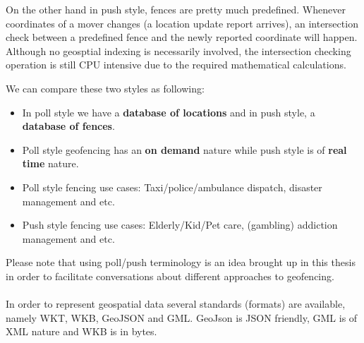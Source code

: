 \documentclass[a4]{report}
\begin{document}
    On the other hand in push style, fences are pretty much predefined.
    Whenever coordinates of a mover changes (a location update report arrives), an intersection check between a
    predefined fence and the newly reported coordinate will happen.
    Although no geosptial indexing is necessarily involved, the intersection checking operation is still CPU
    intensive due to the required mathematical calculations.

    We can compare these two styles as following:
    \begin{itemize}
        \item In poll style we have a \textbf{database of locations} and in push style, a \textbf{database of fences}.
        \item Poll style geofencing has an \textbf{on demand} nature while push style is of \textbf{real time} nature.
        \item Poll style fencing use cases: Taxi/police/ambulance dispatch, disaster management and etc.
        \item Push style fencing use cases: Elderly/Kid/Pet care, (gambling) addiction management and etc.
    \end{itemize}

    Please note that using poll/push terminology is an idea brought up in this thesis in order to facilitate
    conversations about different approaches to geofencing.

    \paragraph{}
    In order to represent geospatial data several standards (formats) are available, namely WKT, WKB, GeoJSON and GML.
    GeoJson is JSON friendly, GML is of XML nature and WKB is in bytes.
\end{document}
